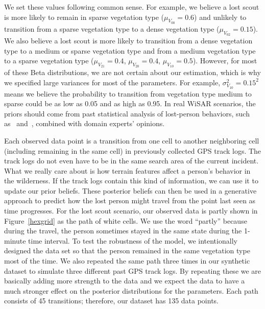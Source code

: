 \documentclass[smallextended,natbib]{svjour3}
\begin{document}
We set these values following common sense. For example, we believe a lost scout is more likely to remain in sparse vegetation type ($\mu_{V_{00}}=0.6$) and unlikely to transition from a sparse vegetation type to a dense vegetation type ($\mu_{V_{02}}=0.15$). We also believe a lost scout is more likely to transition from a dense vegetation type to a medium or sparse vegetation type and from a medium vegetation type to a sparse vegetation type ($\mu_{V_{21}}=0.4$, $\mu_{V_{20}}=0.4$, $\mu_{V_{10}}=0.5$). However, for most of these Beta distributions, we are not certain about our estimation, which is why we specified large variances for most of the parameters. For example, $\sigma^2_{V_{10}}=0.15^2$ means we believe the probability to transition from vegetation type medium to sparse could be as low as 0.05 and as high as 0.95. In real WiSAR scenarios, the priors should come from past statistical analysis of lost-person behaviors, such as~\cite{CanadaSAR} and~\cite{AnalysisOfLostPersonBehavior}, combined with domain experts' opinions.

Each observed data point is a transition from one cell to another neighboring cell (including remaining in the same cell) in previously collected GPS track logs. The track logs do not even have to be in the same search area of the current incident. What we really care about is how terrain features affect a person's behavior in the wilderness. If the track logs contain this kind of information, we can use it to update our prior beliefs. These posterior beliefs can then be used in a generative approach to predict how the lost person might travel from the point last seen as time progresses. For the lost scout scenario, our observed data is partly shown in Figure~\ref{hexgrid} as the path of white cells. We use the word ``partly'' because during the travel, the person sometimes stayed in the same state during the 1-minute time interval. To test the robustness of the model, we intentionally designed the data set so that the person remained in the same vegetation type most of the time. We also repeated the same path three times in our synthetic dataset to simulate three different past GPS track logs. By repeating these we are basically adding more strength to the data and we expect the data to have a much stronger effect on the posterior distributions for the parameters. Each path consists of 45 transitions; therefore, our dataset has 135 data points.



\end{document}
